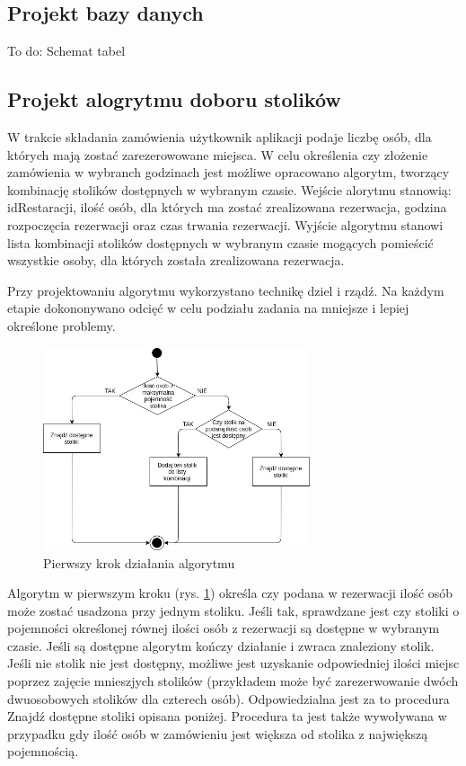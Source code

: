 \documentclass{article}
\begin{document}
\subsection{Projekt bazy danych}
To do:
Schemat tabel


\subsection{Projekt alogrytmu doboru stolików}
W trakcie składania zamówienia użytkownik aplikacji podaje liczbę osób, dla których mają zostać zarezerowowane miejsca. W celu określenia czy złożenie zamówienia w wybranch godzinach jest możliwe opracowano algorytm, tworzący kombinację stolików dostępnych w wybranym czasie. Wejście alorytmu stanowią:
idRestaracji,
ilość osób, dla których ma zostać zrealizowana rezerwacja,
godzina rozpoczęcia rezerwacji oraz
czas trwania rezerwacji.
Wyjście algorytmu stanowi lista kombinacji stolików dostępnych w wybranym czasie mogących pomieścić wszystkie osoby, dla których została zrealizowana rezerwacja. 

Przy projektowaniu algorytmu wykorzystano technikę dziel i rządź. Na każdym etapie dokononywano odcięć w celu podziału zadania na mniejsze i lepiej określone problemy.

\begin{figure}[h]
\centering
	\includegraphics[width=0.70\textwidth]{algo1.jpg}
	\caption[caption]{Pierwszy krok działania algorytmu}
	\label{fig:alg1}
\end{figure}

Algorytm w pierwszym kroku (rys. \ref{fig:alg1}) określa czy podana w rezerwacji ilość osób może zostać usadzona przy jednym stoliku. Jeśli tak, sprawdzane jest czy stoliki o pojemności określonej równej ilości osób z rezerwacji są dostępne w wybranym czasie. Jeśli są dostępne algorytm kończy działanie i zwraca znaleziony stolik. Jeśli nie stolik nie jest dostępny, możliwe jest uzyskanie odpowiedniej ilości miejsc poprzez zajęcie mnieszjych stolików (przykładem może być zarezerwowanie dwóch dwuosobowych stolików dla czterech osób). Odpowiedzialna jest za to procedura Znajdź dostępne stoliki opisana poniżej. Procedura ta jest także wywoływana w przypadku gdy ilość osób w zamówieniu jest większa od stolika z największą pojemnością.
\end{document}
